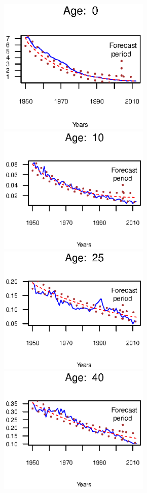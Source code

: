 \documentclass[smallextended]{svjour3}
\begin{document}
\begin{figure}[H]
    \includegraphics[width = 2.85in]{PlotMenForecast0.eps}
    \includegraphics[width = 2.85in]{PlotMenForecast10.eps}
    \includegraphics[width = 2.85in]{PlotMenForecast25.eps}
    \includegraphics[width = 2.85in]{PlotMenForecast40.eps}

\end{figure}
\end{document}
